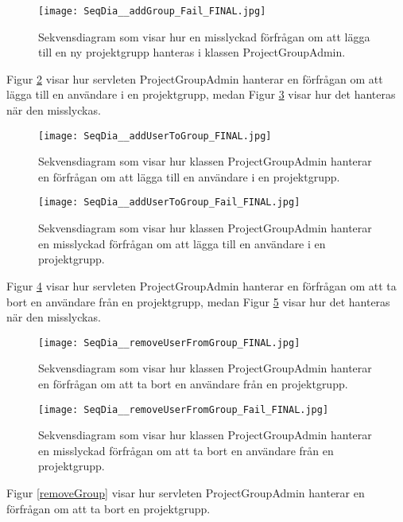 \documentclass[a4paper]{article}
\begin{document}
\begin{figure}[h!]
\centering
\texttt{[image: SeqDia\_\_addGroup\_Fail\_FINAL.jpg]}
\caption{Sekvensdiagram som visar hur en misslyckad förfrågan om att lägga till en ny projektgrupp hanteras i klassen ProjectGroupAdmin. \label{addGroupFail}}
\end{figure}

\noindent
Figur \ref{addUserToGroup} visar hur servleten ProjectGroupAdmin hanterar en förfrågan om att lägga till en användare i en projektgrupp, medan Figur \ref{addUserToGroupFail} visar hur det hanteras när den misslyckas.

\begin{figure}[h!]
\centering
\texttt{[image: SeqDia\_\_addUserToGroup\_FINAL.jpg]}
\caption{Sekvensdiagram som visar hur klassen ProjectGroupAdmin hanterar en förfrågan om att lägga till en användare i en projektgrupp.
\label{addUserToGroup}}
\end{figure}

\begin{figure}[h!]
\centering
\texttt{[image: SeqDia\_\_addUserToGroup\_Fail\_FINAL.jpg]}
\caption{Sekvensdiagram som visar hur klassen ProjectGroupAdmin hanterar en misslyckad förfrågan om att lägga till en användare i en projektgrupp.
\label{addUserToGroupFail}}
\end{figure}

\noindent
Figur \ref{removeUserFromGroup} visar hur servleten ProjectGroupAdmin hanterar en förfrågan om att ta bort en användare från en projektgrupp, medan Figur \ref{removeUserFromGroupFail} visar hur det hanteras när den misslyckas.

\begin{figure}[h!]
\centering
\texttt{[image: SeqDia\_\_removeUserFromGroup\_FINAL.jpg]}
\caption{Sekvensdiagram som visar hur klassen ProjectGroupAdmin hanterar en förfrågan om att ta bort en användare från en projektgrupp.
\label{removeUserFromGroup}}
\end{figure}

\begin{figure}[h!]
\centering
\texttt{[image: SeqDia\_\_removeUserFromGroup\_Fail\_FINAL.jpg]}
\caption{Sekvensdiagram som visar hur klassen ProjectGroupAdmin hanterar en misslyckad förfrågan om att ta bort en användare från en projektgrupp.
\label{removeUserFromGroupFail}}
\end{figure}

\noindent
Figur \ref{removeGroup} visar hur servleten ProjectGroupAdmin hanterar en förfrågan om att ta bort en projektgrupp.
\end{document}
